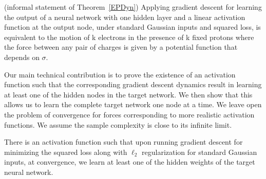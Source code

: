 \begin{theorem}(informal statement of Theorem~\ref{EPDyn})
Applying gradient descent for learning the output of a neural network
with one hidden layer and a linear activation function at the output
node, under standard Gaussian inputs and squared loss, 
is equivalent to the motion of k electrons in the presence of k fixed
protons where the force between any pair of charges is given by a
potential function that depends on $\sigma$.
\end{theorem}
%

Our main technical contribution is to prove the existence of an activation function such that the corresponding gradient descent dynamics result in learning at least one of the hidden nodes in the target network. We then show that this allows us to learn the complete target network one node at a time. We leave open the problem of convergence for forces corresponding to more realistic activation functions.
%
{\color{red} We assume the sample complexity is close to its infinite limit.  }

%
\begin{theorem}
There is an activation function such that upon running gradient
  descent for minimizing the squared loss along with $\ell_2$
  regularization for standard Gaussian inputs, at convergence, 
  we learn at least one of
  the hidden weights of the target neural network.
\end{theorem}



